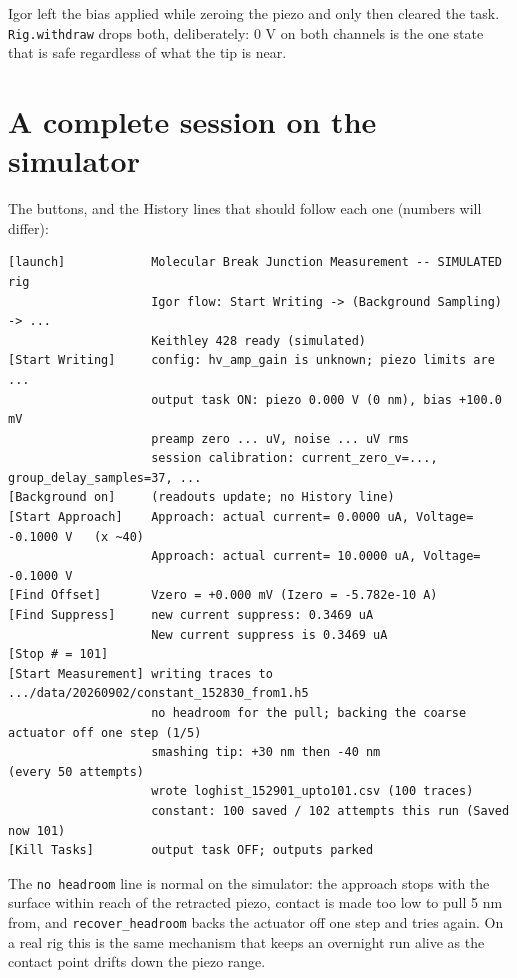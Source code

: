 Igor left the bias applied while zeroing the piezo and only then cleared the task. \texttt{Rig.\discretionary{}{}{}withdraw} drops both, deliberately: 0 V on both channels is the one state that is safe regardless of what the tip is near.

\section{A complete session on the simulator}

The buttons, and the History lines that should follow each one (numbers will differ):

\begin{lstlisting}[style=out]
[launch]            Molecular Break Junction Measurement -- SIMULATED rig
                    Igor flow: Start Writing -> (Background Sampling) -> ...
                    Keithley 428 ready (simulated)
[Start Writing]     config: hv_amp_gain is unknown; piezo limits are ...
                    output task ON: piezo 0.000 V (0 nm), bias +100.0 mV
                    preamp zero ... uV, noise ... uV rms
                    session calibration: current_zero_v=..., group_delay_samples=37, ...
[Background on]     (readouts update; no History line)
[Start Approach]    Approach: actual current= 0.0000 uA, Voltage= -0.1000 V   (x ~40)
                    Approach: actual current= 10.0000 uA, Voltage= -0.1000 V
[Find Offset]       Vzero = +0.000 mV (Izero = -5.782e-10 A)
[Find Suppress]     new current suppress: 0.3469 uA
                    New current suppress is 0.3469 uA
[Stop # = 101]
[Start Measurement] writing traces to .../data/20260902/constant_152830_from1.h5
                    no headroom for the pull; backing the coarse actuator off one step (1/5)
                    smashing tip: +30 nm then -40 nm                         (every 50 attempts)
                    wrote loghist_152901_upto101.csv (100 traces)
                    constant: 100 saved / 102 attempts this run (Saved now 101)
[Kill Tasks]        output task OFF; outputs parked
\end{lstlisting}

The \texttt{no headroom} line is normal on the simulator: the approach stops with the surface within reach of the retracted piezo, contact is made too low to pull 5 nm from, and \texttt{recover\_\discretionary{}{}{}headroom} backs the actuator off one step and tries again. On a real rig this is the same mechanism that keeps an overnight run alive as the contact point drifts down the piezo range.

